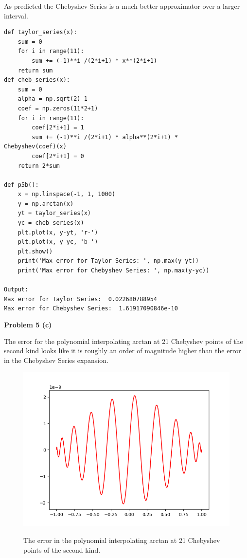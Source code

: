 \documentclass[12pt]{article}
\newcommand{\problem}[1]{\hspace{-4 ex} \large \textbf{Problem #1} }
\begin{document}
	As predicted the Chebyshev Series is a much better approximator over a larger interval.
	
	\begin{lstlisting}
def taylor_series(x):
	sum = 0
	for i in range(11):
		sum += (-1)**i /(2*i+1) * x**(2*i+1)
	return sum
def cheb_series(x):
	sum = 0
	alpha = np.sqrt(2)-1
	coef = np.zeros(11*2+1)
	for i in range(11):
		coef[2*i+1] = 1
		sum += (-1)**i /(2*i+1) * alpha**(2*i+1) * 
Chebyshev(coef)(x)
		coef[2*i+1] = 0
	return 2*sum

def p5b():
	x = np.linspace(-1, 1, 1000)
	y = np.arctan(x)
	yt = taylor_series(x)
	yc = cheb_series(x)
	plt.plot(x, y-yt, 'r-')
	plt.plot(x, y-yc, 'b-')
	plt.show()
	print('Max error for Taylor Series: ', np.max(y-yt))
	print('Max error for Chebyshev Series: ', np.max(y-yc))
	
Output: 
Max error for Taylor Series:  0.022680788954
Max error for Chebyshev Series:  1.61917090846e-10
	\end{lstlisting}


\bigbreak
\problem{5 (c)} 

	The error for the polynomial interpolating arctan at 21 Chebyshev points of the second kind looks like it is roughly an order of magnitude higher than the error in the Chebyshev Series expansion. 

	\begin{figure}[h]
		\caption{The error in the polynomial interpolating arctan at 21 Chebyshev points of the second kind.}
		\includegraphics[width=1.0\textwidth]{hw6_p5_fig2}
		\label{arctan_interp_approx}
		\centering
	\end{figure}
	
\end{document}
